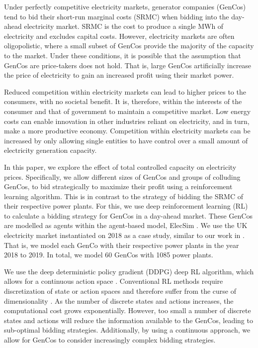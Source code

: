 Under perfectly competitive electricity markets, generator companies (GenCos) tend to bid their short-run marginal costs (SRMC) when bidding into the day-ahead electricity market. SRMC is the cost to produce a single MWh of electricity and excludes capital costs. However, electricity markets are often oligopolistic, where a small subset of GenCos provide the majority of the capacity to the market. Under these conditions, it is possible that the assumption that GenCos are price-takers does not hold. That is, large GenCos artificially increase the price of electricity to gain an increased profit using their market power. 

Reduced competition within electricity markets can lead to higher prices to the consumers, with no societal benefit. It is, therefore, within the interests of the consumer and that of government to maintain a competitive market. Low energy costs can enable innovation in other industries reliant on electricity, and in turn, make a more productive economy. Competition within electricity markets can be increased by only allowing single entities to have control over a small amount of electricity generation capacity.

In this paper, we explore the effect of total controlled capacity on electricity prices. Specifically, we allow different sizes of GenCos and groups of colluding GenCos, to bid strategically to maximize their profit using a reinforcement learning algorithm. This is in contrast to the strategy of bidding the SRMC of their respective power plants. For this, we use deep reinforcement learning (RL) to calculate a bidding strategy for GenCos in a day-ahead market. These GenCos are modelled as agents within the agent-based model, ElecSim \cite{Kell, Kell2020}. We use the UK electricity market instantiated on 2018 as a case study, similar to our work in \cite{Kell2019a}. That is, we model each GenCo with their respective power plants in the year 2018 to 2019. In total, we model 60 GenCos with 1085 power plants.

We use the deep deterministic policy gradient (DDPG) deep RL algorithm, which allows for a continuous action space \cite{Hunt2016}. Conventional RL methods require discretization of state or action spaces and therefore suffer from the curse of dimensionality \cite{Ye2020a}. As the number of discrete states and actions increases, the computational cost grows exponentially. However, too small a number of discrete states and actions will reduce the information available to the GenCos, leading to sub-optimal bidding strategies. Additionally, by using a continuous approach, we allow for GenCos to consider increasingly complex bidding strategies. 

